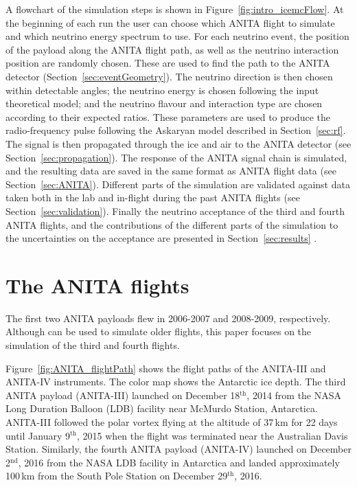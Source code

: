 A flowchart of the \icemc simulation steps is shown in Figure~\ref{fig:intro_icemcFlow}.
At the beginning of each run the user can choose which ANITA flight to simulate and which neutrino energy spectrum to use.
For each neutrino event, the position of the payload along the ANITA flight path, as well as the neutrino interaction position are randomly chosen.
These are used to find the path to the ANITA detector (Section~\ref{sec:eventGeometry}). 
The neutrino direction is then chosen within detectable angles; the neutrino energy is chosen following the input theoretical model; and the neutrino flavour and interaction type are chosen according to their expected ratios. 
These parameters are used to produce the radio-frequency pulse following the Askaryan model described in Section~\ref{sec:rf}.
The signal is then propagated through the ice and air to the ANITA
detector (see Section~\ref{sec:propagation}). 
The response of the ANITA signal chain is simulated, and the resulting 
data are saved in the same format as ANITA flight data 
(see Section~\ref{sec:ANITA}).
Different parts of the simulation are validated against data taken both in
the lab and in-flight during the past ANITA flights (see
Section~\ref{sec:validation}).
Finally the neutrino acceptance of the third and fourth ANITA flights, and
the contributions of the different parts of the simulation to the uncertainties on the acceptance are presented in Section~\ref{sec:results} .


\section{The ANITA flights}
\label{sec:anita3}
The first two ANITA payloads flew in 2006-2007\cite{ANITA1paper} and 2008-2009\cite{ANITA2paper,ANITA2erratum}, respectively.
Although \icemc can be used to simulate older flights, this paper focuses on the simulation of the third and fourth flights.

Figure~\ref{fig:ANITA_flightPath} shows the flight paths of the ANITA-III and ANITA-IV instruments. 
The color map shows the Antarctic ice depth. 
The third ANITA payload (ANITA-III) launched on December 18$^{\text{th}}$, 2014 from the
NASA Long Duration Balloon (LDB) facility near McMurdo Station, Antarctica.
ANITA-III followed the polar vortex flying at the altitude of 37\,km for
22 days until January 9$^{\text{th}}$, 2015 when the flight was terminated
near the Australian Davis Station.
Similarly, the fourth ANITA payload (ANITA-IV) launched on December 2$^{\text{nd}}$, 2016 from the NASA LDB facility in Antarctica and landed approximately 100\,km from the South Pole Station on December 29$^{\text{th}}$, 2016.


